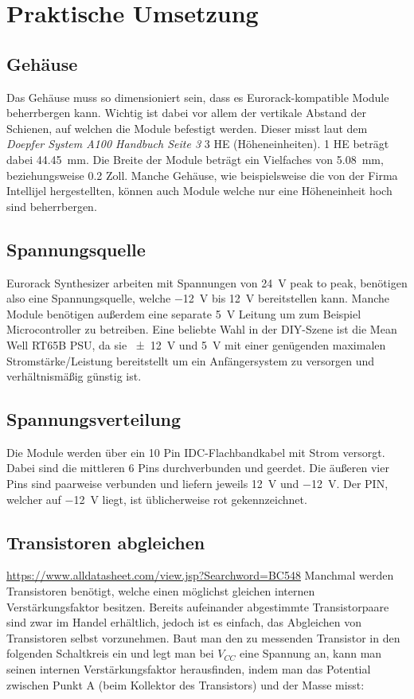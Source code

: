 \chapter{Praktische Umsetzung}

\section{Gehäuse}
\label{sec:org867e60d}
Das Gehäuse muss so dimensioniert sein, dass es Eurorack-kompatible Module beherrbergen kann. Wichtig ist dabei vor allem der vertikale Abstand der Schienen, auf welchen die Module befestigt werden. Dieser misst laut dem \emph{Doepfer System A100 Handbuch Seite 3} 3 HE (Höheneinheiten). 1 HE beträgt dabei \SI{44.45}{\milli\meter}. Die Breite der Module beträgt ein Vielfaches von \SI{5.08}{\milli\meter}, beziehungsweise 0.2 Zoll. Manche Gehäuse, wie beispielsweise die von der Firma Intellijel hergestellten, können auch Module welche nur eine Höheneinheit hoch sind beherrbergen.

\section{Spannungsquelle}
\label{sec:org84fd952}
Eurorack Synthesizer arbeiten mit Spannungen von \SI{24}{\volt} peak to peak, benötigen also eine Spannungsquelle, welche \SI{-12}{\volt} bis \SI{+12}{\volt} bereitstellen kann. Manche Module benötigen außerdem eine separate \SI{5}{\volt} Leitung um zum Beispiel Microcontroller zu betreiben. Eine beliebte Wahl in der DIY-Szene ist die Mean Well RT65B PSU, da sie \SI{\pm 12}{\volt} und \SI{5}{\volt} mit einer genügenden maximalen Stromstärke/Leistung bereitstellt um ein Anfängersystem zu versorgen und verhältnismäßig günstig ist.

\section{Spannungsverteilung}
\label{sec:org683288d}
Die Module werden über ein 10 Pin IDC-Flachbandkabel mit Strom versorgt. Dabei sind die mittleren 6 Pins durchverbunden und geerdet. Die äußeren vier Pins sind paarweise verbunden und liefern jeweils \SI{+12}{\volt} und \SI{-12}{\volt}. Der PIN, welcher auf \SI{-12}{\volt} liegt, ist üblicherweise rot gekennzeichnet.

\section{Transistoren abgleichen}
\label{sec:org855ccff}
\url{https://www.alldatasheet.com/view.jsp?Searchword=BC548}
Manchmal werden Transistoren benötigt, welche einen möglichst gleichen internen Verstärkungsfaktor besitzen. Bereits aufeinander abgestimmte Transistorpaare sind zwar im Handel erhältlich, jedoch ist es einfach, das Abgleichen von Transistoren selbst vorzunehmen. Baut man den zu messenden Transistor in den folgenden Schaltkreis ein und legt man bei \(V_{CC}\) eine Spannung an, kann man seinen internen Verstärkungsfaktor herausfinden, indem man das Potential zwischen Punkt A (beim Kollektor des Transistors) und der Masse misst:


